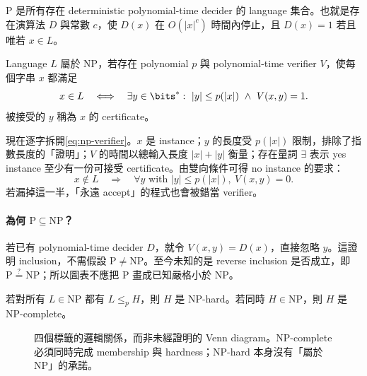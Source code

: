 \documentclass[11pt,a4paper,oneside,openany]{book}
\begin{document}
\begin{definition}[P]
$\mathrm P$ 是所有存在 deterministic polynomial-time decider 的 language 集合。也就是存在演算法 $D$ 與常數 $c$，使 $D(x)$ 在 $O(|x|^c)$ 時間內停止，且 $D(x)=1$ 若且唯若 $x\in L$。
\end{definition}

\begin{definition}[NP：verifier 形式]
Language $L$ 屬於 $\mathrm{NP}$，若存在 polynomial $p$ 與 polynomial-time verifier $V$，使每個字串 $x$ 都滿足
\begin{equation}
 x\in L
 \quad\Longleftrightarrow\quad
 \exists y\in\bits^*:\ |y|\le p(|x|)\ \land\ V(x,y)=1.
 \label{eq:np-verifier}
\end{equation}
被接受的 $y$ 稱為 $x$ 的 certificate。
\end{definition}

現在逐字拆開\cref{eq:np-verifier}。$x$ 是 instance；$y$ 的長度受 $p(|x|)$ 限制，排除了指數長度的「證明」；$V$ 的時間以總輸入長度 $|x|+|y|$ 衡量；存在量詞 $\exists$ 表示 yes instance 至少有一份可接受 certificate。由雙向條件可得 no instance 的要求：
\[
 x\notin L\quad\Longrightarrow\quad
 \forall y\text{ with }|y|\le p(|x|),\ V(x,y)=0.
\]
若漏掉這一半，「永遠 accept」的程式也會被錯當 verifier。

\paragraph{為何 $\mathrm P\subseteq\mathrm{NP}$？}
若已有 polynomial-time decider $D$，就令 $V(x,y)=D(x)$，直接忽略 $y$。這證明 inclusion，不需假設 $\mathrm P\ne\mathrm{NP}$。至今未知的是 reverse inclusion 是否成立，即 $\mathrm P\stackrel{?}=\mathrm{NP}$；所以圖表不應把 P 畫成已知嚴格小於 NP。

\begin{definition}
若對所有 $L\in\mathrm{NP}$ 都有 $L\le_p H$，則 $H$ 是 NP-hard。若同時 $H\in\mathrm{NP}$，則 $H$ 是 NP-complete。
\end{definition}

\begin{figure}[htbp]
\centering
{}
\caption{四個標籤的邏輯關係，而非未經證明的 Venn diagram。NP-complete 必須同時完成 membership 與 hardness；NP-hard 本身沒有「屬於 NP」的承諾。}
\label{fig:complexity-relations}
\end{figure}
\end{document}
